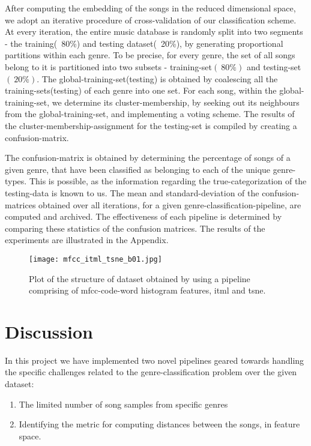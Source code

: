 \documentclass[10pt]{article}
\begin{document}
After computing the embedding of the songs in the reduced dimensional space, we adopt an iterative procedure of cross-validation of our classification scheme. At every iteration, the entire music database is randomly split into two segments - the training(~80\%) and testing dataset(~20\%), by generating proportional partitions within each genre.
To be precise, for every genre, the set of all songs belong to it is partitioned into two subsets - training-set$(~80\%)$ and testing-set$(~20\%)$. The global-training-set(testing) is obtained by coalescing all the training-sets(testing) of each genre into one set. For each song, within the global-training-set, we determine its cluster-membership, by seeking out its neighbours from the global-training-set, and implementing a voting scheme. The results of the cluster-membership-assignment for the testing-set is compiled by creating a confusion-matrix. 

The confusion-matrix is obtained by determining the percentage of songs of a given genre, that have been classified as belonging to each of the unique genre-types. This is possible, as the information regarding the true-categorization of the testing-data is known to us.   The mean and standard-deviation of the confusion-matrices obtained over all iterations, for a given genre-classification-pipeline, are computed and archived. The effectiveness of each pipeline is determined by comparing these statistics of the confusion matrices. The results of the experiments are illustrated in the Appendix. 


\begin{figure}[h!]
\centering
\texttt{[image: mfcc\_itml\_tsne\_b01.jpg]}\\
\caption{Plot of the structure of dataset obtained by using a pipeline comprising of mfcc-code-word histogram features, itml and tsne.}
\label{fig:mfccw_itml_tsne}
\end{figure}



\section{Discussion}

In this project we have implemented two novel pipelines geared towards handling the specific challenges related to the genre-classification problem over the given dataset:
\begin{enumerate}
\item The limited number of song samples from specific genres
\item Identifying the metric for computing distances between the songs, in feature space. 
\end{enumerate}
\end{document}
